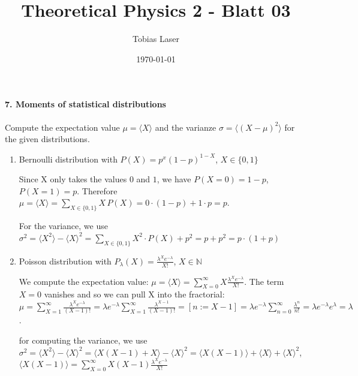 \documentclass[11pt,a4paper]{scrartcl}
\begin{document}
\title{Theoretical Physics 2 - Blatt 03}
\author{Tobias Laser}
\date{\today}
\maketitle
\vfill
\thispagestyle{empty}


\paragraph{7. Moments of statistical distributions}
Compute the expectation value $\mu = \langle X\rangle$ and the varianze $\sigma = \langle (X - \mu)^2\rangle$ for the given distributions.

\begin{enumerate}[label=(\alph*)]
    \item Bernoulli distribution with $P(X) = p^x (1-p)^{1-X}$, $X\in \{0,1\}$

    \begin{calculationbox}
    Since X only takes the values $0$ and $1$, we have 
    $P(X=0)=1-p$, $P(X=1)=p$. Therefore $\mu = \langle X \rangle = \sum\limits_{X\in\{0,1\}} X \,P(X) = 0 \cdot (1-p)+ 1 \cdot p = p$.

    For the variance, we use 
    $\sigma^2 = \langle X^2\rangle - \langle X\rangle^2 = \sum\limits_{X\in\{0,1\}} X^2\cdot P(X) + p^2 = p + p^2 = p\cdot (1+p)$ 
    \end{calculationbox}

    \item Poisson distribution with $P_\lambda(X) = \frac{\lambda^Xe^{-\lambda}}{X!}$, $X \in \mathbb{N}$

    \begin{calculationbox}
        We compute the expectation value: $\mu =\langle X\rangle = \sum\limits_{X=0}^\infty X \frac{\lambda^Xe^{-\lambda}}{X!}$. The term $X = 0$ vanishes and so we can pull X into the fractorial: $\mu = \sum\limits_{X=1}^\infty \frac{\lambda^Xe^{-\lambda}}{(X - 1)!} = \lambda e^{-\lambda} \sum\limits_{X=1}^\infty \frac{\lambda^{X-1}}{(X - 1)!} = [n := X - 1] = \lambda e^{-\lambda} \sum\limits_{n=0}^\infty \frac{\lambda^{n}}{n!} = \lambda e^{-\lambda} e^\lambda = \lambda$. 

        for computing the variance, we use $\sigma^2 = \langle X^2 \rangle - \langle X \rangle^2 = \langle X (X - 1) + X \rangle - \langle X \rangle^2 = \langle X(X - 1)\rangle + \langle X \rangle + \langle X \rangle^2$, $\langle X(X-1) \rangle = \sum\limits_{X=0}^\infty X(X-1) \frac{\lambda^Xe^{-\lambda}}{X!}$


\end{calculationbox}
\end{enumerate}
\end{document}
